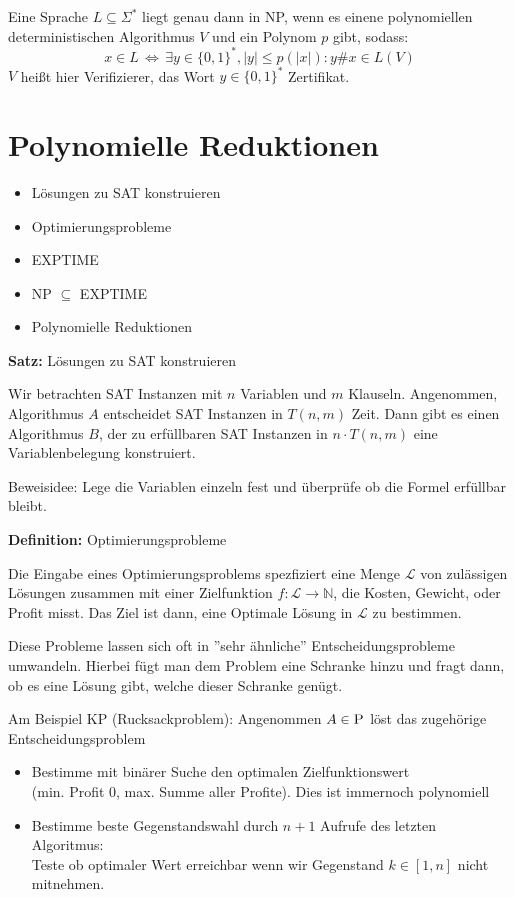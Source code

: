 \documentclass[a4paper,graphics,11pt]{article}
\newcommand{\Iff}[0]{\,\Longleftrightarrow\,}
\begin{document}
Eine Sprache $L \subseteq \Sigma^*$ liegt genau dann in \textsf{NP}, wenn es
einene polynomiellen deterministischen Algorithmus $V$ und ein Polynom $p$ gibt, sodass:
$$
    x \in L \Iff \exists y \in \{0,1\}^*, |y| \leq p(|x|): y\#x \in L(V)
$$
$V$ heißt hier Verifizierer, das Wort $y \in \{0,1\}^*$ Zertifikat.

\newpage

\section{Polynomielle Reduktionen}

\begin{itemize}
    \item Lösungen zu SAT konstruieren
    \item Optimierungsprobleme
    \item \textsf{EXPTIME}
    \item \textsf{NP} $\subseteq$ \textsf{EXPTIME}
    \item Polynomielle Reduktionen
\end{itemize}

\textbf{Satz:} Lösungen zu SAT konstruieren

Wir betrachten SAT Instanzen mit $n$ Variablen und $m$ Klauseln. Angenommen, Algorithmus $A$ entscheidet
SAT Instanzen in $T(n,m)$ Zeit. Dann gibt es einen Algorithmus $B$, der zu erfüllbaren SAT Instanzen
in $n\cdot T(n,m)$ eine Variablenbelegung konstruiert.

Beweisidee: Lege die Variablen einzeln fest und überprüfe ob die Formel erfüllbar bleibt.

\strut

\textbf{Definition:} Optimierungsprobleme

Die Eingabe eines Optimierungsproblems spezfiziert eine Menge $\mathcal{L}$ von zulässigen Lösungen
zusammen mit einer Zielfunktion $f : \mathcal{L} \to \mathbb{N}$, die Kosten, Gewicht, oder Profit misst.
Das Ziel ist dann, eine Optimale Lösung in $\mathcal{L}$ zu bestimmen.

Diese Probleme lassen sich oft in ''sehr ähnliche'' Entscheidungsprobleme umwandeln.
Hierbei fügt man dem Problem eine Schranke hinzu und fragt dann, ob es eine Lösung gibt,
welche dieser Schranke genügt.

Am Beispiel KP (Rucksackproblem): Angenommen $A \in \textsc{P}$ löst das zugehörige Entscheidungsproblem
\begin{itemize}
    \item Bestimme mit binärer Suche den optimalen Zielfunktionswert\\
        (min. Profit 0, max. Summe aller Profite). Dies ist immernoch polynomiell
    \item Bestimme beste Gegenstandswahl durch $n+1$ Aufrufe des letzten Algoritmus:\\
        Teste ob optimaler Wert erreichbar wenn wir Gegenstand $k \in [1,n]$ nicht mitnehmen.
\end{itemize}
\end{document}
